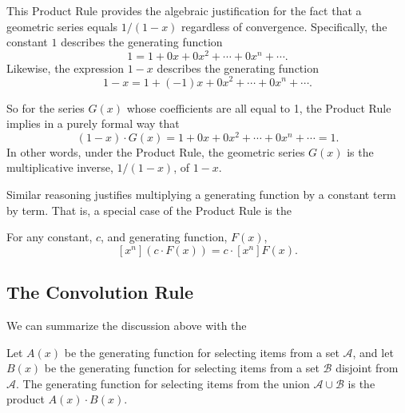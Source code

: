 This Product Rule provides the algebraic justification for the fact
that a geometric series equals $1/(1-x)$ regardless of convergence.
Specifically, the constant $1$ describes the generating function
\[
1 = 1+ 0x+ 0x^2 + \cdots + 0x^n + \cdots.
\]
Likewise, the expression $1-x$ describes the generating function
\[
1-x = 1+ (-1)x+ 0x^2 + \cdots + 0x^n + \cdots.
\]
\iffalse Since all but the first two coefficents for $1-x$ are zero,
the Product Rule implies that for any generating function $F(x)$,
\begin{align*}
[x^0]((1-x)F(x)) & = f_0\\
[x^n]((1-x)F(x)) & = f_n-f_{n-1} & for $n>0$,
\end{align*}
so in particular for geometric series $G(x)$, the only nonzero coefficent
of $(1-x)\cdot G(x)$ is the coefficient of $x^0$, which equals $g_0 = 1$.
\fi
So for the series $G(x)$ whose coefficients are all equal to 1, the
Product Rule implies in a purely formal way that
\[
(1-x)\cdot G(x) = 1+ 0x+ 0x^2 + \cdots + 0x^n + \cdots = 1.
\]
In other words, under the Product Rule, the geometric series $G(x)$ is
the multiplicative inverse, $1/(1-x)$, of $1-x$.

Similar reasoning justifies multiplying a generating function by a
constant term by term.  That is, a special case of the Product Rule is
the
\begin{rul*}
For any constant, $c$, and generating function, $F(x)$,
\begin{equation}\label{xncFcn}
[x^n](c \cdot F(x)) = c \cdot [x^n]F(x).
\end{equation}
\end{rul*}

\iffalse
Letting
\[
P(x) = (1-x) \cdot (1+x+x^2+\cdots+x^n+\cdots),
\]
the Product Rule gives
\begin{align*}
[x^0]P(x) & = 1 \cdot 1 = 1,\\
[x^{n+1}]P(x)& = 1\cdot 1+ (-1)\cdot 1 +0\cdot 1 +\cdots + 0\cdot 1 = 0.
\end{align*}
That is,
\[
P(x) = 1 + 0\cdot x +  0\cdot x^2 + \cdots = 1.
\]
\fi

\subsection{The Convolution Rule}

We can summarize the discussion above with the
\begin{mathrule*}\label{convolution_rule}
Let $A(x)$ be the generating function for selecting items from a set
$\mathcal{A}$, and let $B(x)$ be the generating function for selecting
items from a set $\mathcal{B}$ disjoint from $\mathcal{A}$.  The
generating function for selecting items from the union $\mathcal{A} \cup
\mathcal{B}$ is the product $A(x) \cdot B(x)$.
\end{mathrule*}

